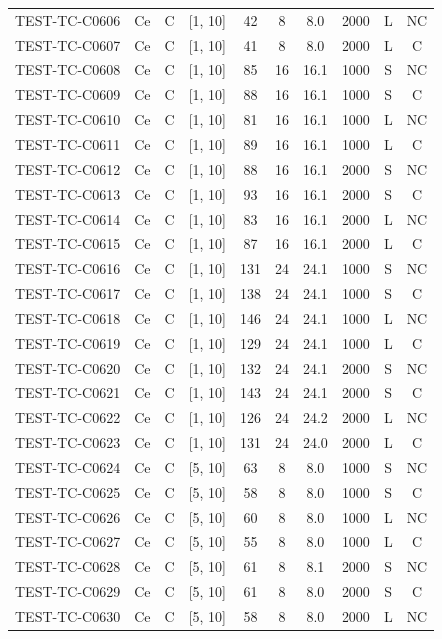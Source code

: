 \begin{longtable}{lccccccccc}
TEST-TC-C0606 & Ce & C & [1, 10] & 42 & 8 & 8.0 & 2000 & L & NC \\
TEST-TC-C0607 & Ce & C & [1, 10] & 41 & 8 & 8.0 & 2000 & L & C \\
TEST-TC-C0608 & Ce & C & [1, 10] & 85 & 16 & 16.1 & 1000 & S & NC \\
TEST-TC-C0609 & Ce & C & [1, 10] & 88 & 16 & 16.1 & 1000 & S & C \\
TEST-TC-C0610 & Ce & C & [1, 10] & 81 & 16 & 16.1 & 1000 & L & NC \\
TEST-TC-C0611 & Ce & C & [1, 10] & 89 & 16 & 16.1 & 1000 & L & C \\
TEST-TC-C0612 & Ce & C & [1, 10] & 88 & 16 & 16.1 & 2000 & S & NC \\
TEST-TC-C0613 & Ce & C & [1, 10] & 93 & 16 & 16.1 & 2000 & S & C \\
TEST-TC-C0614 & Ce & C & [1, 10] & 83 & 16 & 16.1 & 2000 & L & NC \\
TEST-TC-C0615 & Ce & C & [1, 10] & 87 & 16 & 16.1 & 2000 & L & C \\
TEST-TC-C0616 & Ce & C & [1, 10] & 131 & 24 & 24.1 & 1000 & S & NC \\
TEST-TC-C0617 & Ce & C & [1, 10] & 138 & 24 & 24.1 & 1000 & S & C \\
TEST-TC-C0618 & Ce & C & [1, 10] & 146 & 24 & 24.1 & 1000 & L & NC \\
TEST-TC-C0619 & Ce & C & [1, 10] & 129 & 24 & 24.1 & 1000 & L & C \\
TEST-TC-C0620 & Ce & C & [1, 10] & 132 & 24 & 24.1 & 2000 & S & NC \\
TEST-TC-C0621 & Ce & C & [1, 10] & 143 & 24 & 24.1 & 2000 & S & C \\
TEST-TC-C0622 & Ce & C & [1, 10] & 126 & 24 & 24.2 & 2000 & L & NC \\
TEST-TC-C0623 & Ce & C & [1, 10] & 131 & 24 & 24.0 & 2000 & L & C \\
TEST-TC-C0624 & Ce & C & [5, 10] & 63 & 8 & 8.0 & 1000 & S & NC \\
TEST-TC-C0625 & Ce & C & [5, 10] & 58 & 8 & 8.0 & 1000 & S & C \\
TEST-TC-C0626 & Ce & C & [5, 10] & 60 & 8 & 8.0 & 1000 & L & NC \\
TEST-TC-C0627 & Ce & C & [5, 10] & 55 & 8 & 8.0 & 1000 & L & C \\
TEST-TC-C0628 & Ce & C & [5, 10] & 61 & 8 & 8.1 & 2000 & S & NC \\
TEST-TC-C0629 & Ce & C & [5, 10] & 61 & 8 & 8.0 & 2000 & S & C \\
TEST-TC-C0630 & Ce & C & [5, 10] & 58 & 8 & 8.0 & 2000 & L & NC \\

\end{longtable}
